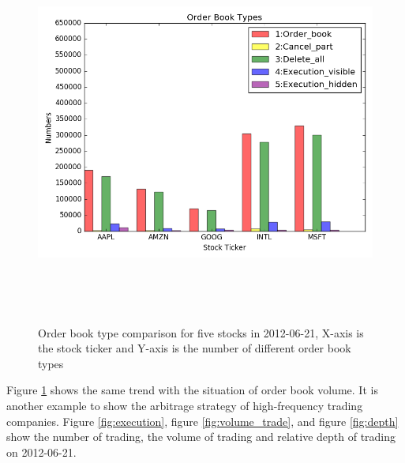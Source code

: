 \begin{figure} [hp]
  \begin{center}
    \includegraphics[width=6in,  height=5in]{figures/order_book_type.png}
  \end{center}
\caption{Order book type comparison for five stocks in 2012-06-21,  X-axis is the stock ticker and Y-axis is the number of different order book types} \label{fig:order_book_type}
\end{figure}
Figure \ref{fig:order_book_type} shows the same trend with the situation of order book volume. It is another example to show the arbitrage strategy of high-frequency trading companies. Figure \ref{fig:execution}, figure \ref{fig:volume_trade}, and figure \ref{fig:depth} show the number of trading, the volume of trading and relative depth of trading on 2012-06-21.


